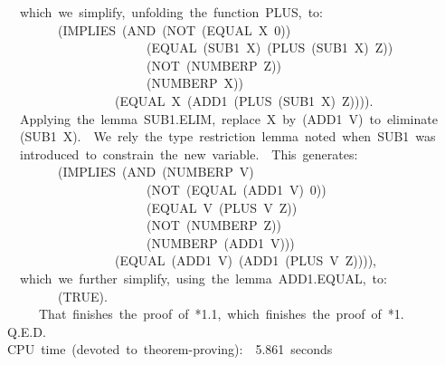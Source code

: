 \documentclass[11pt]{book}
\newenvironment{pubasis}{\begin{flushleft}\ttfamily\small}{\normalsize\rmfamily\end{flushleft}}
\begin{document}
\begin{pubasis}
~~which~we~simplify,~unfolding~the~function~PLUS,~to:\\

~~~~~~~~(IMPLIES~(AND~(NOT~(EQUAL~X~0))\\
~~~~~~~~~~~~~~~~~~~~~~(EQUAL~(SUB1~X)~(PLUS~(SUB1~X)~Z))\\
~~~~~~~~~~~~~~~~~~~~~~(NOT~(NUMBERP~Z))\\
~~~~~~~~~~~~~~~~~~~~~~(NUMBERP~X))\\
~~~~~~~~~~~~~~~~~(EQUAL~X~(ADD1~(PLUS~(SUB1~X)~Z)))).\\

~~Applying~the~lemma~SUB1.ELIM,~replace~X~by~(ADD1~V)~to~eliminate\\
~~(SUB1~X).~~We~rely~the~type~restriction~lemma~noted~when~SUB1~was\\
~~introduced~to~constrain~the~new~variable.~~This~generates:\\

~~~~~~~~(IMPLIES~(AND~(NUMBERP~V)\\
~~~~~~~~~~~~~~~~~~~~~~(NOT~(EQUAL~(ADD1~V)~0))\\
~~~~~~~~~~~~~~~~~~~~~~(EQUAL~V~(PLUS~V~Z))\\
~~~~~~~~~~~~~~~~~~~~~~(NOT~(NUMBERP~Z))\\
~~~~~~~~~~~~~~~~~~~~~~(NUMBERP~(ADD1~V)))\\
~~~~~~~~~~~~~~~~~(EQUAL~(ADD1~V)~(ADD1~(PLUS~V~Z)))),\\

~~which~we~further~simplify,~using~the~lemma~ADD1.EQUAL,~to:\\

~~~~~~~~(TRUE).\\

~~~~~That~finishes~the~proof~of~*1.1,~which~finishes~the~proof~of~*1.\\
Q.E.D.\\

CPU~time~(devoted~to~theorem-proving):~~5.861~seconds\\
\end{pubasis}
\end{document}
